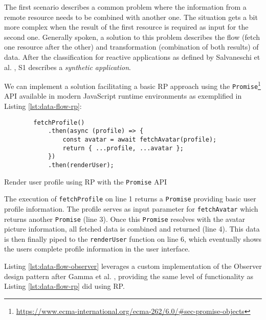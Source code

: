 \documentclass[12pt,a4paper]{article}
\begin{document}
The first scenario describes a common problem where the information from a remote resource needs to be combined with another one. The situation gets a bit more complex when the result of the first resource is required as input for the second one. Generally spoken, a solution to this problem describes the flow (fetch one resource after the other) and transformation (combination of both results) of data. After the classification for reactive applications as defined by Salvaneschi et al. \cite{7827078}, S1 describes a \emph{synthetic application}.

We can implement a solution facilitating a basic RP approach using the \texttt{Promise}\footnote{\url{https://www.ecma-international.org/ecma-262/6.0/\#sec-promise-objects}} API available in modern JavaScript runtime environments as exemplified in Listing \ref{lst:data-flow-rp}:

\begin{listing}[H]
	\begin{verbatim}
		fetchProfile()
			.then(async (profile) => {
				const avatar = await fetchAvatar(profile);
				return { ...profile, ...avatar };
			})
			.then(renderUser);
	\end{verbatim}
	\caption{Render user profile using RP with the \texttt{Promise} API}
	\label{lst:data-flow-rp}
\end{listing}

The execution of \texttt{fetchProfile} on line 1 returns a \texttt{Promise} providing basic user profile information. The profile serves as input parameter for \texttt{fetchAvatar} which returns another \texttt{Promise} (line 3). Once this \texttt{Promise} resolves with the avatar picture information, all fetched data is combined and returned (line 4). This data is then finally piped to the \texttt{renderUser} function on line 6, which eventually shows the users complete profile information in the user interface.

Listing \ref{lst:data-flow-observer} leverages a custom implementation of the Observer design pattern after Gamma et al. \cite{gamma1995design}, providing the same level of functionality as Listing \ref{lst:data-flow-rp} did using RP.
\end{document}
